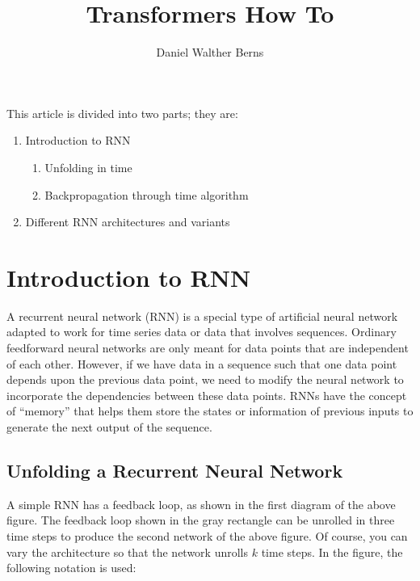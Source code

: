 \documentclass[10pt,a4paper]{article}
\author{Daniel Walther Berns}
\title{Transformers How To}
\begin{document}
	\maketitle

    This article is divided into two parts; they are:
\begin{enumerate}
	\item Introduction to RNN
	\begin{enumerate}
		\item Unfolding in time
		\item Backpropagation through time algorithm
	\end{enumerate}
	\item Different RNN architectures and variants
\end{enumerate}
	
	\section{Introduction to RNN}
	
A recurrent neural network (RNN) is a special type of artificial neural network adapted to work for time series data or data that involves sequences. Ordinary feedforward neural networks are only meant for data points that are independent of each other. However, if we have data in a sequence such that one data point depends upon the previous data point, we need to modify the neural network to incorporate the dependencies between these data points. RNNs have the concept of “memory” that helps them store the states or information of previous inputs to generate the next output of the sequence.

\subsection{Unfolding a Recurrent Neural Network}

A simple RNN has a feedback loop, as shown in the first diagram of the above figure. The feedback loop shown in the gray rectangle can be unrolled in three time steps to produce the second network of the above figure. Of course, you can vary the architecture so that the network unrolls $k$ time steps. In the figure, the following notation is used:
\end{document}
